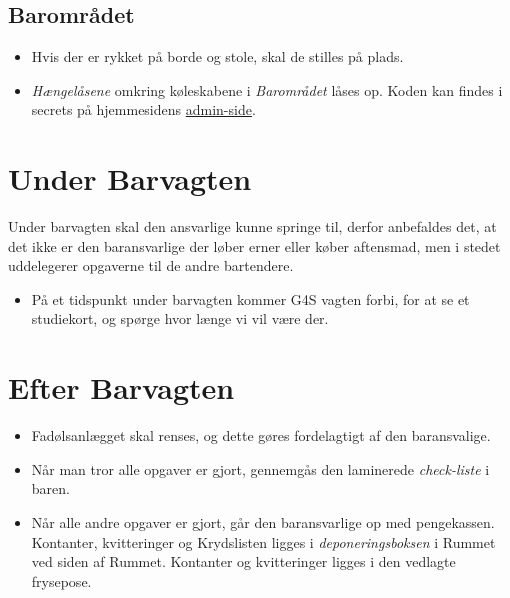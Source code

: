 \subsection{Barområdet}
\label{sec:pre:baromradet}

\begin{itemize}
    \item Hvis der er rykket på borde og stole, skal de stilles på plads.
    \item \textit{Hængelåsene} omkring køleskabene i \textit{Barområdet} låses op. 
    Koden kan findes i secrets på hjemmesidens \href{https://fredagscafeen.dk/admin}{admin-side}.
\end{itemize}

\section{Under Barvagten}
\label{sec:intra-barvagten}
Under barvagten skal den ansvarlige kunne springe til, 
derfor anbefaldes det, at det ikke er den baransvarlige 
der løber erner eller køber aftensmad, men i stedet uddelegerer
opgaverne til de andre bartendere.
\begin{itemize}
    \item På et tidspunkt under barvagten kommer G4S vagten forbi, 
    for at se et studiekort, og spørge hvor længe vi vil være der.
\end{itemize}

\section{Efter Barvagten}
\label{sec:post-barvagten}

\begin{itemize}
    \item Fadølsanlægget skal renses, og dette gøres fordelagtigt af den baransvalige.
    \item Når man tror alle opgaver er gjort, gennemgås den laminerede \textit{check-liste} i baren.
    \item Når alle andre opgaver er gjort, går den baransvarlige op med pengekassen. 
    Kontanter, kvitteringer og Krydslisten ligges i \textit{deponeringsboksen} i Rummet ved
    siden af Rummet. Kontanter og kvitteringer ligges i den vedlagte frysepose.
\end{itemize}

\printindex


